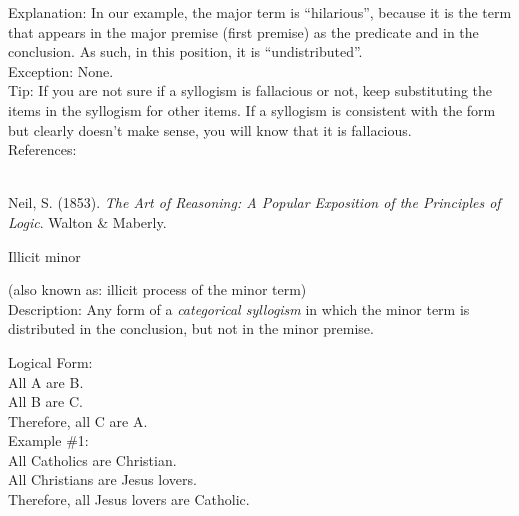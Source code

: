 \documentclass[a4paper,12pt,single,pdftex]{scrbook}
\begin{document}
    
      Explanation: In our example, the major term is “hilarious”, because it is the term that appears in the major premise (first premise) as the predicate and in the conclusion.  As such, in this position, it is “undistributed”.
    \\

    
      Exception: None.
    \\

    
      Tip: If you are not sure if a syllogism is fallacious or not, keep substituting the items in the syllogism for other items. If a syllogism is consistent with the form but clearly doesn’t make sense, you will know that it is fallacious.
    \\

    References:

    
      
        
      \\

      
        
          Neil, S. (1853). {\it The Art of Reasoning: A Popular Exposition of the Principles of Logic}. Walton \& Maberly.
        
      
    
  

Illicit minor
    
      (also known as: illicit process of the minor term)
    \\

  
    Description: Any form of a {\it categorical syllogism} in which the minor term is distributed in the conclusion, but not in the minor premise.

    
      Logical Form:
    \\

    
      All A are B.
    \\

    
      All B are C.
    \\

    
      Therefore, all C are A.
    \\

    
      Example \#1:
    \\

    
      All Catholics are Christian.
    \\

    
      All Christians are Jesus lovers.
    \\

    
      Therefore, all Jesus lovers are Catholic.
    \\
\end{document}
